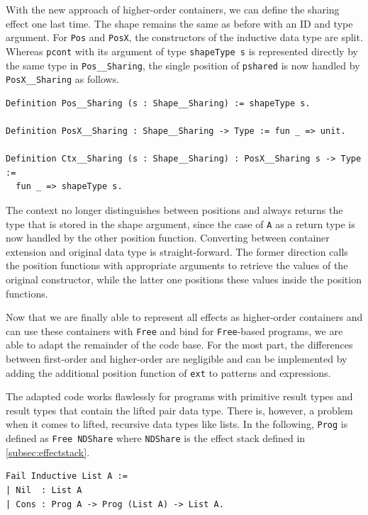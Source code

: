 \documentclass[a4paper, 11pt, fleqn, twoside]{scrreprt}
\newcommand{\cinl}[1]{\texttt{#1}}
\begin{document}
With the new approach of higher-order containers, we can define the sharing effect one last time.
The shape remains the same as before with an ID and type argument.
For \cinl{Pos} and \cinl{PosX}, the constructors of the inductive data type are split.
Whereas \cinl{pcont} with its argument of type \cinl{shapeType s} is represented directly by the same type in \cinl{Pos__Sharing}, the single position of \cinl{pshared} is now handled by \cinl{PosX__Sharing} as follows.

\begin{verbatim}
Definition Pos__Sharing (s : Shape__Sharing) := shapeType s.

Definition PosX__Sharing : Shape__Sharing -> Type := fun _ => unit.

Definition Ctx__Sharing (s : Shape__Sharing) : PosX__Sharing s -> Type :=
  fun _ => shapeType s.
\end{verbatim}

The context no longer distinguishes between positions and always returns the type that is stored in the shape argument, since the case of \cinl{A} as a return type is now handled by the other position function.
Converting between container extension and original data type is straight-forward.
The former direction calls the position functions with appropriate arguments to retrieve the values of the original constructor, while the latter one positions these values inside the position functions.

Now that we are finally able to represent all effects as higher-order containers and can use these containers with \cinl{Free} and bind for \cinl{Free}-based programs, we are able to adapt the remainder of the code base.
For the most part, the differences between first-order and higher-order are negligible and can be implemented by adding the additional position function of \cinl{ext} to patterns and expressions.

The adapted code works flawlessly for programs with primitive result types and result types that contain the lifted pair data type.
There is, however, a problem when it comes to lifted, recursive data types like lists.
In the following, \cinl{Prog} is defined as \cinl{Free NDShare} where \cinl{NDShare} is the effect stack defined in \autoref{subsec:effectstack}.

\begin{verbatim}
Fail Inductive List A :=
| Nil  : List A
| Cons : Prog A -> Prog (List A) -> List A.
\end{verbatim}
\end{document}
